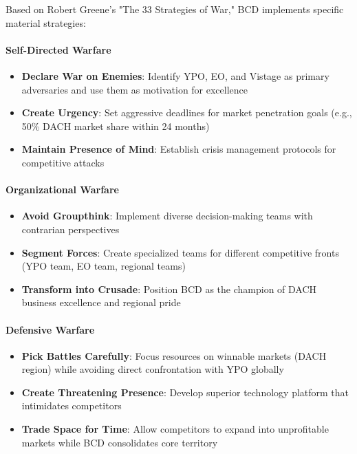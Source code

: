 Based on Robert Greene's "The 33 Strategies of War," BCD implements specific material strategies:

\paragraph{Self-Directed Warfare}
\begin{itemize}
    \item \textbf{Declare War on Enemies}: Identify YPO, EO, and Vistage as primary adversaries and use them as motivation for excellence
    \item \textbf{Create Urgency}: Set aggressive deadlines for market penetration goals (e.g., 50\% DACH market share within 24 months)
    \item \textbf{Maintain Presence of Mind}: Establish crisis management protocols for competitive attacks
\end{itemize}

\paragraph{Organizational Warfare}
\begin{itemize}
    \item \textbf{Avoid Groupthink}: Implement diverse decision-making teams with contrarian perspectives
    \item \textbf{Segment Forces}: Create specialized teams for different competitive fronts (YPO team, EO team, regional teams)
    \item \textbf{Transform into Crusade}: Position BCD as the champion of DACH business excellence and regional pride
\end{itemize}

\paragraph{Defensive Warfare}
\begin{itemize}
    \item \textbf{Pick Battles Carefully}: Focus resources on winnable markets (DACH region) while avoiding direct confrontation with YPO globally
    \item \textbf{Create Threatening Presence}: Develop superior technology platform that intimidates competitors
    \item \textbf{Trade Space for Time}: Allow competitors to expand into unprofitable markets while BCD consolidates core territory
\end{itemize}

